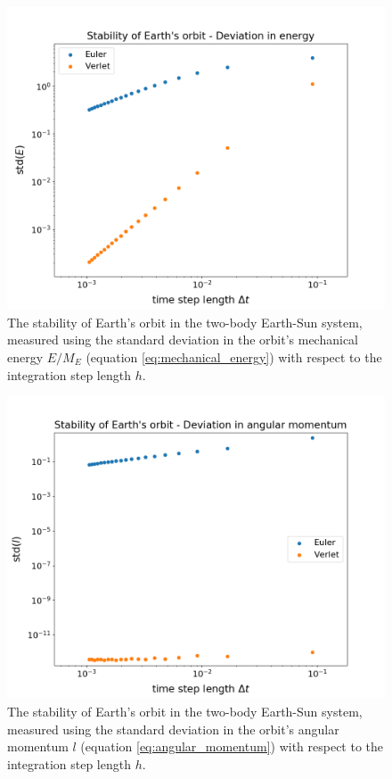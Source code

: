\documentclass[reprint,english]{revtex4-1}
\begin{document}
\begin{figure}[]
\centering
\includegraphics[scale=0.3]{../output/test_algorithms/Earth_Stability_energy.png}
\caption{The stability of Earth's orbit in the two-body Earth-Sun system, measured using the standard deviation in the orbit's mechanical energy \(E/M_E\) (equation \eqref{eq:mechanical_energy}) with respect to the integration step length \(h\).}\label{fig:Earth_circular_stability_energy}
\end{figure}

\begin{figure}[]
\centering
\includegraphics[scale=0.3]{../output/test_algorithms/Earth_Stability_angmom.png}
\caption{The stability of Earth's orbit in the two-body Earth-Sun system, measured using the standard deviation in the orbit's angular momentum \(l\) (equation \eqref{eq:angular_momentum}) with respect to the integration step length \(h\).}\label{fig:Earth_circular_stability_angmom}
\end{figure}
\end{document}
